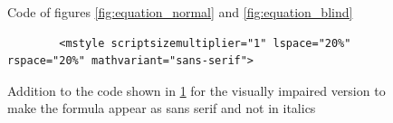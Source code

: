 \begin{figure}[H]

	
\caption{Code of figures \ref{fig:equation_normal} and \ref{fig:equation_blind}}
	\label{fig:math_code}
\end{figure}

\begin{figure}[H]
	\lstset{language=HTML}
	\begin{lstlisting}
		<mstyle scriptsizemultiplier="1" lspace="20%" rspace="20%" mathvariant="sans-serif">
	\end{lstlisting}
	\caption{Addition to the code shown in \ref{fig:math_code} for the visually impaired version to make the formula appear as sans serif and not in italics}
		\label{fig:math_vi_code}
\end{figure}


